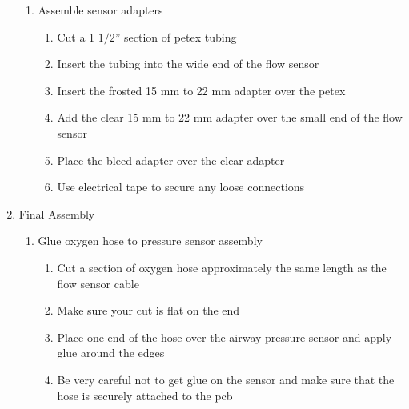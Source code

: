 \documentclass[11pt, letterpaper]{article}
\begin{document}
\begin{enumerate}
\begin{enumerate}[label=4.\arabic*]
\item
Assemble sensor adapters

\begin{enumerate}[label=4.3.\arabic*]
\item
Cut a 1 $1/2$'' section of petex tubing
\item
Insert the tubing into the wide end of the flow sensor
\item
Insert the frosted 15 mm to 22 mm adapter over the petex
\item
Add the clear 15 mm to 22 mm adapter over the small end of the flow sensor
\item
Place the bleed adapter over the clear adapter
\item
Use electrical tape to secure any loose connections
\end{enumerate}

\end{enumerate}

\item
Final Assembly

\begin{enumerate}[label=5.\arabic*]
\item
Glue oxygen hose to pressure sensor assembly
\begin{enumerate}[label=5.1.\arabic*]
\item
Cut a section of oxygen hose approximately the same length as the flow sensor cable
\item
Make sure your cut is flat on the end
\item
Place one end of the hose over the airway pressure sensor and apply glue around the edges
\item
Be very careful not to get glue on the sensor and make sure that the hose is securely attached to the pcb
\end{enumerate}


\end{enumerate}
\end{enumerate}
\end{document}
